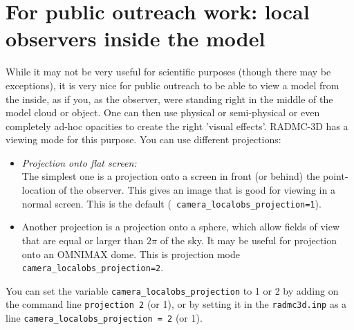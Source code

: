\documentclass{report}
\begin{document}
\section{For public outreach work: local observers inside the model}
\label{sec-local-observer}
%
While it may not be very useful for scientific purposes (though there may be
exceptions), it is very nice for public outreach to be able to view a model
from the inside, as if you, as the observer, were standing right in the
middle of the model cloud or object. One can then use physical or
semi-physical or even completely ad-hoc opacities to create the right
'visual effects'. RADMC-3D has a viewing mode for this purpose. You can use
different projections:
\begin{itemize}
\item {\em Projection onto flat screen:}\\
  The simplest one is a projection onto a screen in front (or behind) the
  point-location of the observer. This gives an image that is good for
  viewing in a normal screen. This is the default ({\small\tt
    camera\_localobs\_projection=1}).
\item Another projection is a projection onto a sphere, which allow fields
  of view that are equal or larger than $2\pi$ of the sky. It may be useful
  for projection onto an OMNIMAX dome. This is projection mode {\small\tt
    camera\_localobs\_projection=2}.
\end{itemize}
You can set the variable {\small\tt camera\_localobs\_projection} to 1 or
2 by adding on the command line {\small\tt projection 2} (or 1), or by
setting it in the {\small\tt radmc3d.inp} as a line 
{\small\tt camera\_localobs\_projection = 2} (or 1). 
\end{document}
